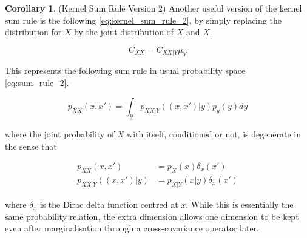 \documentclass[twoside]{article} \usepackage{aistats2017}
\theoremstyle{definition}
\newtheorem{corollary}[theorem]{Corollary}
\newcommand{\rv}[1]{{#1}}
\newcommand{\muY}{\mu_{\rv{Y}}}
\newcommand{\Cxx}{C_{\rv{X} \rv{X}}}
\begin{document}
		\begin{corollary} \label{thm:kernel_sum_rule_2}
			(Kernel Sum Rule Version 2)
			Another useful version of the kernel sum rule is the following \eqref{eq:kernel_sum_rule_2}, by simply replacing the distribution for $\rv{X}$ by the joint distribution of $\rv{X}$ and $\rv{X}$.
			
			\begin{equation}
				\Cxx = C_{\rv{X} \rv{X} | \rv{Y}} \muY
			\label{eq:kernel_sum_rule_2}
			\end{equation}
			
			This represents the following sum rule in usual probability space \eqref{eq:sum_rule_2}.
			
			\begin{equation}
				p_{\rv{X} \rv{X}}(x, x') = \int_{\mathcal{Y}} p_{\rv{X} \rv{X} | \rv{Y}}((x, x') | y) p_{\rv{y}}(y) dy
			\label{eq:sum_rule_2}
			\end{equation}
			
			where the joint probability of $\rv{X}$ with itself, conditioned or not, is degenerate in the sense that
			
			\begin{equation}
			\begin{aligned}
				p_{\rv{X} \rv{X}}(x, x') &= p_{\rv{X}}(x) \delta_{x}(x') \\
				p_{\rv{X} \rv{X} | \rv{Y}}((x, x') | y) &= p_{\rv{X} | \rv{Y}}(x | y) \delta_{x}(x')
			\end{aligned}
			\end{equation}
			
			where $\delta_{x}$ is the Dirac delta function centred at $x$. While this is essentially the same probability relation, the extra dimension allows one dimension to be kept even after marginalisation through a cross-covariance operator later.
		
		\end{corollary}
		
\end{document}
